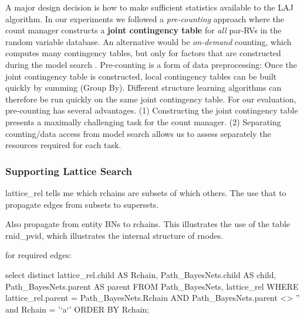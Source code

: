  A major design decision is how to make sufficient statistics available to the LAJ algorithm. In our experiments we followed a {\em pre-counting} approach where the count manager constructs a \textbf{joint contingency table} for {\em all} par-RVs in the random variable database. An alternative would be {\em on-demand} counting, which computes many contingency tables, but only for factors that are constructed during the model search \cite{Lv2012}.
Pre-counting is a form of data preprocessing: Once the joint contingency table is constructed, local contingency tables can be built quickly by summing (Group By). Different structure learning algorithms can therefore be run quickly on the same joint contingency table. 
%
For our evaluation, pre-counting has several advantages. (1) Constructing the joint contingency table presents a maximally challenging task for the count manager. (2) Separating counting/data access from model search allows us to assess separately the resources required for each task.
 
\subsubsection{Supporting Lattice Search}
 
lattice\_rel tells me which rchains are subsets of which others. The use that to propagate edges from subsets to supersets.

Also propagate from entity BNs to rchains. This illustrates the use of the table rnid\_pvid, which illustrates the internal structure of rnodes. 

for required edges:

select distinct
        lattice\_rel.child AS Rchain,
        Path\_BayesNets.child AS child,
        Path\_BayesNets.parent AS parent
    FROM
        Path\_BayesNets,
        lattice\_rel
    WHERE
        lattice\_rel.parent = Path\_BayesNets.Rchain
            AND Path\_BayesNets.parent <> '' and Rchain = '`a`'
    ORDER BY Rchain;

